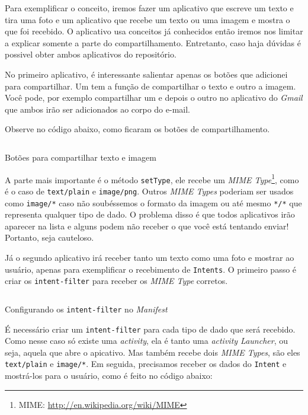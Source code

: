 \documentclass[a4paper,12pt,brazil]{book}
\begin{document}
\begin{singlespace}
		Para exemplificar o conceito, iremos fazer um aplicativo que escreve um texto e tira uma foto e um aplicativo que recebe um texto ou uma imagem e mostra o que foi recebido. O aplicativo usa conceitos já conhecidos então iremos nos limitar a explicar somente a parte do compartilhamento. Entretanto, caso haja dúvidas é possivel obter ambos aplicativos do repositório.

		No primeiro aplicativo, é interessante salientar apenas os botões que adicionei para compartilhar. Um tem a função de compartilhar o texto e outro a imagem. Você pode, por exemplo compartilhar um e depois o outro no aplicativo do \emph{Gmail} que ambos irão ser adicionados ao corpo do e-mail.
		
		Observe no código abaixo, como ficaram os botões de compartilhamento.

		\begin{listing}[H]
		\inputminted[linenos=true,fontsize=\small,frame=lines, framesep=2mm, tabsize=2,numbersep=5pt]{java}{src/api/sharing/sharingbtn.java}
		\caption{Botões para compartilhar texto e imagem}
		\label{code:sharingbtn}
		\end{listing} 		

		A parte mais importante é o método \texttt{setType}, ele recebe um \emph{MIME Type}\footnote{MIME: \href{http://en.wikipedia.org/wiki/MIME}{http://en.wikipedia.org/wiki/MIME}}, como é o caso de \texttt{text/plain} e \texttt{image/png}. Outros \emph{MIME Types} poderiam ser usados como \texttt{image/*} caso não soubéssemos o formato da imagem ou até mesmo \texttt{*/*} que representa qualquer tipo de dado. O problema disso é que todos aplicativos irão aparecer na lista e alguns podem não receber o que você está tentando enviar! Portanto, seja cauteloso.

		Já o segundo aplicativo irá receber tanto um texto como uma foto e mostrar ao usuário, apenas para exemplificar o recebimento de \texttt{Intents}. O primeiro passo é criar os \texttt{intent-filter} para receber os \emph{MIME Type} corretos.

		\begin{listing}[H]
		\inputminted[linenos=true,fontsize=\small,frame=lines, framesep=2mm, tabsize=2,numbersep=5pt]{xml}{src/api/sharing/intentfilter.xml}
		\caption{Configurando os \texttt{intent-filter} no \emph{Manifest}}
		\label{code:intentfilter}
		\end{listing} 	

		É necessário criar um \texttt{intent-filter} para cada tipo de dado que será recebido. Como nesse caso só existe uma \emph{activity}, ela é tanto uma \emph{activity Launcher}, ou seja, aquela que abre o apicativo. Mas também recebe dois \emph{MIME Types}, são eles \texttt{text/plain} e \texttt{image/*}. Em seguida, precisamos receber os dados do \texttt{Intent} e mostrá-los para o usuário, como é feito no código abaixo:


\end{singlespace}
\end{document}
